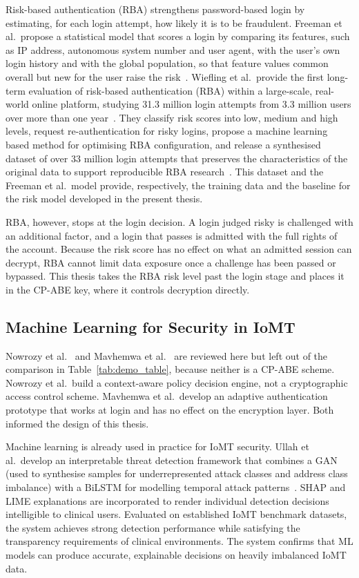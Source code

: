Risk-based authentication (RBA) strengthens password-based login by estimating, for each login attempt, how likely it is to be fraudulent. Freeman et al.\ propose a statistical model that scores a login by comparing its features, such as IP address, autonomous system number and user agent, with the user's own login history and with the global population, so that feature values common overall but new for the user raise the risk~\cite{freeman2016you}. Wiefling et al.\ provide the first long-term evaluation of risk-based authentication (RBA) within a large-scale, real-world online platform, studying 31.3 million login attempts from 3.3 million users over more than one year~\cite{wiefling2023pump}. They classify risk scores into low, medium and high levels, request re-authentication for risky logins, propose a machine learning based method for optimising RBA configuration, and release a synthesised dataset of over 33 million login attempts that preserves the characteristics of the original data to support reproducible RBA research~\cite{wiefling2023pump}. This dataset and the Freeman et al.\ model provide, respectively, the training data and the baseline for the risk model developed in the present thesis.

RBA, however, stops at the login decision. A login judged risky is challenged with an additional factor, and a login that passes is admitted with the full rights of the account. Because the risk score has no effect on what an admitted session can decrypt, RBA cannot limit data exposure once a challenge has been passed or bypassed. This thesis takes the RBA risk level past the login stage and places it in the CP-ABE key, where it controls decryption directly.

\subsection{Machine Learning for Security in IoMT}
\label{sec:subsection_213}

Nowrozy et al.~\cite{nowrozy2025caabac} and Mavhemwa et al.~\cite{mavhemwa2025naivebayes} are reviewed here but left out of the comparison in Table~\ref{tab:demo_table}, because neither is a CP-ABE scheme. Nowrozy et al.\ build a context-aware policy decision engine, not a cryptographic access control scheme. Mavhemwa et al.\ develop an adaptive authentication prototype that works at login and has no effect on the encryption layer. Both informed the design of this thesis.

Machine learning is already used in practice for IoMT security. Ullah et al.\ develop an interpretable threat detection framework that combines a GAN (used to synthesise samples for underrepresented attack classes and address class imbalance) with a BiLSTM for modelling temporal attack patterns~\cite{ullah2025interpretable}. SHAP and LIME explanations are incorporated to render individual detection decisions intelligible to clinical users. Evaluated on established IoMT benchmark datasets, the system achieves strong detection performance while satisfying the transparency requirements of clinical environments. The system confirms that ML models can produce accurate, explainable decisions on heavily imbalanced IoMT data.

